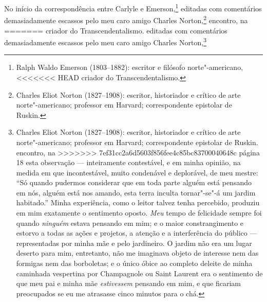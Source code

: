{{{{{{{{{{{{{{{{{{{{{{{{{{{{{{{{{{{{{{{{{{{{{{{{{{{{{{{{{{{{{{{{{{{{{%
No início da correspondência entre Carlyle e Emerson,\footnote{Ralph
  Waldo Emerson (1803--1882): escritor e filósofo norte"-americano,
<<<<<<< HEAD
  criador do Transcendentalismo.} editadas com
comentários demasiadamente escassos pelo meu caro amigo Charles
Norton,\footnote{Charles Eliot Norton (1827--1908): escritor, historiador
  e crítico de arte norte"-americano; professor em Harvard;
  correspondente epistolar de Ruskin.} encontro, na
=======
  criador do Transcendentalismo.  editadas com
comentários demasiadamente escassos pelo meu caro amigo Charles
Norton,\footnote{Charles Eliot Norton (1827--1908): escritor, historiador
  e crítico de arte norte"-americano; professor em Harvard;
  correspondente epistolar de Ruskin.  encontro, na
>>>>>>> 7ef31cc2a6d5603f856fee4c85bc83700040648c
página 18 esta observação --- inteiramente contestável, e em minha
opinião, na medida em que incontestável, muito condenável e deplorável,
de meu mestre: ``Só quando pudermos considerar que em toda parte alguém
está pensando em nós, alguém está nos amando, esta terra inculta
tornar"-se"-á um jardim habitado.'' Minha experiência, como o leitor
talvez tenha percebido, produziu em mim exatamente o sentimento oposto.
\textit{Meu} tempo de felicidade sempre foi quando \textit{ninguém} estava
pensando em mim; e o maior constrangimento e estorvo a todas as ações e
projetos, a atenção e a interferência do público --- representadas por
minha mãe e pelo jardineiro. O jardim não era um lugar deserto para mim,
entretanto, não me imaginava objeto de interesse nem das formigas nem
das borboletas; e o único óbice ao completo deleite de minha caminhada
vespertina por Champagnole ou Saint Laurent era o sentimento de que meu
pai e minha mãe \textit{estivessem} pensando em mim, e que ficariam
preocupados se eu me atrasasse cinco minutos para o chá.

}}}}}}}}}}}}}}}}}}}}}}}}}}}}}}}}}}}}}}}}}}}}}}}}}}}}}}}}}}}}}}}}}}}}}}
